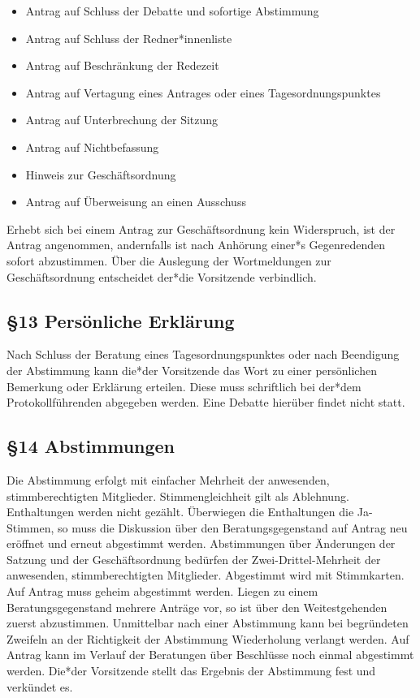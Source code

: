 \documentclass[12pt]{report}
\begin{document}
\begin{flushleft}
\begin{itemize}
  \item Antrag auf Schluss der Debatte und sofortige Abstimmung
  \item Antrag auf Schluss der Redner*innenliste
  \item Antrag auf Beschränkung der Redezeit
  \item Antrag auf Vertagung eines Antrages oder eines Tagesordnungspunktes
  \item Antrag auf Unterbrechung der Sitzung
  \item Antrag auf Nichtbefassung
  \item Hinweis zur Geschäftsordnung
  \item Antrag auf Überweisung an einen Ausschuss
\end{itemize}

Erhebt sich bei einem Antrag zur Geschäftsordnung kein Widerspruch, ist der Antrag angenommen,
andernfalls ist nach Anhörung einer*s Gegenredenden sofort abzustimmen. Über die Auslegung der Wortmeldungen
zur Geschäftsordnung entscheidet der*die Vorsitzende verbindlich.

\subsection*{§13 Persönliche Erklärung}
Nach Schluss der Beratung eines Tagesordnungspunktes oder nach Beendigung der Abstimmung kann
die*der Vorsitzende das Wort zu einer persönlichen Bemerkung oder Erklärung erteilen. Diese muss
schriftlich bei der*dem Protokollführenden abgegeben werden. Eine Debatte hierüber findet nicht statt.
\subsection*{§14 Abstimmungen}
Die Abstimmung erfolgt mit einfacher Mehrheit der anwesenden, stimmberechtigten Mitglieder.
Stimmengleichheit gilt als Ablehnung. Enthaltungen werden nicht gezählt. Überwiegen die Enthaltungen
die Ja-Stimmen, so muss die Diskussion über den Beratungsgegenstand auf Antrag neu eröffnet und erneut
abgestimmt werden. Abstimmungen über Änderungen der Satzung und der Geschäftsordnung bedürfen der 
Zwei-Drittel-Mehrheit der anwesenden, stimmberechtigten Mitglieder. Abgestimmt wird mit Stimmkarten.
Auf Antrag muss geheim abgestimmt werden. Liegen zu einem Beratungsgegenstand mehrere Anträge vor, so ist
über den Weitestgehenden zuerst abzustimmen. Unmittelbar nach einer Abstimmung kann bei begründeten
Zweifeln an der Richtigkeit der Abstimmung Wiederholung verlangt werden. Auf Antrag kann im Verlauf der
Beratungen über Beschlüsse noch einmal abgestimmt werden. Die*der Vorsitzende stellt das Ergebnis der
Abstimmung fest und verkündet es.

\end{flushleft}
\end{document}

